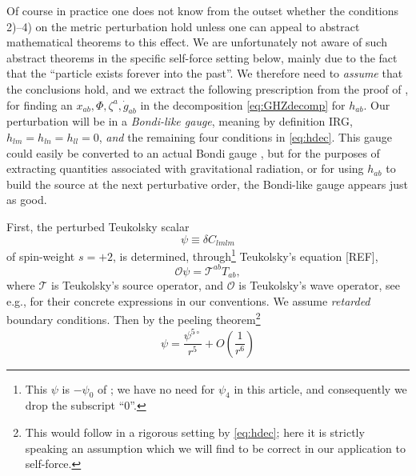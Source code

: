 \documentclass[%
reprint,
 prd,
superscriptaddress,
nofootinbib,
aps,
dvipsnames
]{revtex4-2}
\newcommand{\T}{{\mathcal T}}
\renewcommand{\O}{{\mathcal O}}
\begin{document}
Of course in practice one does not know from the outset whether the conditions 2)--4) on the metric perturbation hold unless one can appeal to abstract mathematical theorems to this effect. 
We are unfortunately not aware of such abstract theorems in the specific self-force setting below, mainly due to the fact that the ``particle exists forever into the past''. We therefore need to {\it assume} that the conclusions \cite[Thm. 4]{Hollands:2024iqp} hold, and we extract the following 
prescription from the proof of \cite[Thm. 4]{Hollands:2024iqp}, for finding an $x_{ab}, \Phi, \zeta^a, \dot g_{ab}$ in the decomposition \eqref{eq:GHZdecomp} for $h_{ab}$. Our perturbation will be in a {\it Bondi-like gauge}, meaning by definition IRG,
$h_{lm}=h_{ln}=h_{ll}=0$, {\it and} the remaining four conditions in \eqref{eq:hdec}. This gauge could easily be converted to an actual Bondi gauge \cite[App. D]{Hollands:2024iqp}, but for the purposes of extracting quantities associated with gravitational radiation, or for using $h_{ab}$ to build the source at the next perturbative order, the Bondi-like gauge appears just as good.

First, the perturbed Teukolsky scalar 
\begin{equation}
\label{eq:psidef}
\psi \equiv  \delta C_{lmlm}
\end{equation}
of spin-weight $s=+2$, is determined, through\footnote{This $\psi$ is $-\psi_0$ of \cite{Hollands:2024iqp}; we have no need for $\psi_4$ in this article, and consequently we drop the subscript ``0''.} Teukolsky's equation [REF], 
\begin{equation}
\label{eq:Teuksource}
    \O \psi = \T^{ab} T_{ab}, 
\end{equation}
where $\T$ is Teukolsky's source operator, and $\O$ is Teukolsky's wave operator, see e.g., \cite[App. G]{Hollands:2024iqp} for their concrete expressions in our conventions. We assume {\it retarded} boundary conditions. Then by the peeling theorem\footnote{This would follow in a rigorous setting by \eqref{eq:hdec}; here it is strictly speaking an assumption which we will find to be correct in our application to self-force.} 
\begin{equation}
\label{eq:peeling}
    \psi = \frac{\psi^{5\circ}}{r^5} + O\left(\frac{1}{r^6}\right)
\end{equation}
\end{document}
